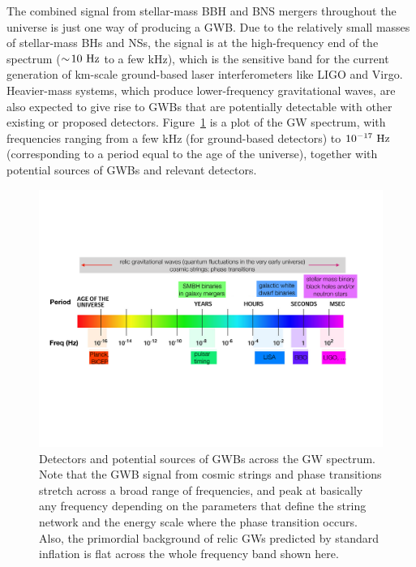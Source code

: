 The combined signal from stellar-mass BBH and BNS 
mergers throughout the universe is just one way 
of producing a GWB.
Due to the relatively small masses of stellar-mass 
BHs and NSs, the signal is at the high-frequency 
end of the spectrum ($\sim\!10~{\rm Hz}$ to a few kHz), 
which is the sensitive band for the current generation 
of km-scale ground-based laser interferometers like 
LIGO and Virgo.
Heavier-mass systems, which produce lower-frequency 
gravitational waves, are also expected to give rise 
to GWBs that are potentially detectable with other 
existing or proposed detectors.
Figure~\ref{f:GWspectrum} is a plot of the GW 
spectrum, with frequencies ranging
from a few kHz (for ground-based detectors)
to $10^{-17}~{\rm Hz}$ (corresponding to a period
equal to the age of the universe), together with 
potential sources of GWBs and relevant detectors.  
%
\begin{figure}[htbp!]
\begin{center}
\includegraphics[width=\textwidth]{Figures/GWspectrum}
\caption{Detectors and potential sources of GWBs
across the GW spectrum.
Note that the GWB signal from cosmic strings and phase 
transitions stretch across a broad range of frequencies, 
and peak at basically any frequency depending on 
the parameters that define the string network and the 
energy scale where the phase transition occurs.
Also, the primordial background of relic GWs predicted 
by standard inflation is flat across the whole frequency 
band shown here.}
\label{f:GWspectrum}
\end{center}
\end{figure}
%

